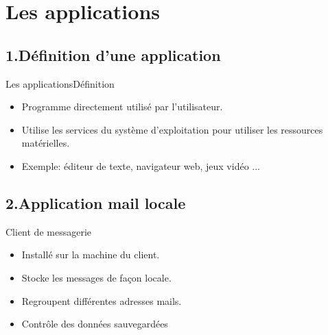 \documentclass{beamer}
\begin{document}
\section{Les applications}

    \subsection{1.Définition d'une application}
        \begin{frame}{Les applications}{Définition}
            \begin{itemize}
                \item {
                    Programme directement utilisé par l'utilisateur.
                }
                \item<2-> {
                    Utilise les services du système d'exploitation pour utiliser les ressources matérielles.
                }
                \item<3->{
                    Exemple: éditeur de texte, navigateur web, jeux vidéo ...
                }
            \end{itemize}
        
        \end{frame}
    \subsection{2.Application mail locale}
        \begin{frame}
        \begin{block}{Client de messagerie}
            \begin{itemize}
                \item {
                    Installé sur la machine du client.
                }
                \item {
                    Stocke les messages de façon locale.
                }
                \item{
                    Regroupent différentes adresses mails.
                }
                \item{
                    Contrôle des données sauvegardées
                }
            \end{itemize}
            \end{block}
        \end{frame}
\end{document}
